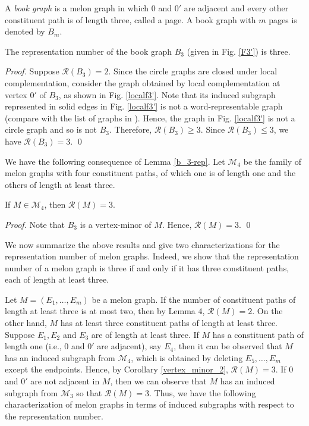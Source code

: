 \documentclass{llncs}
\begin{document}
A \textit{book graph} is a melon graph in which $0$ and $0'$ are adjacent and every other constituent path is of length three, called a page. A book graph with $m$ pages is denoted by $B_m$. 

\begin{lemma}\label{b_3-rep}
	The representation number of the book graph $B_3$ (given in Fig. \ref{F3'}) is three. 
\end{lemma} 
\begin{proof}
	Suppose $\mathcal{R}(B_3) = 2$. Since the circle graphs are closed under local complementation, consider the graph obtained by local complementation at vertex $0'$ of $B_3$, as shown in Fig. \ref{localf3'}. Note that its induced subgraph represented in solid edges in Fig. \ref{localf3'} is not a word-representable graph (compare with the list of graphs in \cite[Figure 3.9]{kitaev15mono}).  Hence, the graph in Fig. \ref{localf3'} is not a circle graph and so is not $B_3$. Therefore, $\mathcal{R}(B_3) \ge 3$. Since $\mathcal{R}(B_3) \le 3$, we have $\mathcal{R}(B_3) = 3$. \qed
\end{proof}

We have the following consequence of Lemma \ref{b_3-rep}. 
Let $\mathcal{M}_4$ be the family of melon graphs with four constituent paths, of which one is of length one and the others of length at least three. 

\begin{corollary}\label{vertex_minor_2}
	If $M \in \mathcal{M}_4$, then $\mathcal{R}(M) = 3$.
\end{corollary} 
\begin{proof}
	Note that $B_3$ is a vertex-minor of $M$. Hence,  $\mathcal{R}(M) = 3$. \qed	
\end{proof}

We now summarize the above results and give two characterizations for the representation number of melon graphs. Indeed, we show that the representation number of a melon graph is three if and only if it has three constituent paths, each of length at least three. 

Let $M = (E_1, \ldots, E_m)$ be a melon graph. If the number of constituent paths of length at least three is at most two, then by Lemma 4, $\mathcal{R}(M) = 2$. On the other hand, $M$ has at least three constituent paths of length at least three. Suppose $E_1, E_2$ and $E_3$ are of length at least three. If $M$ has a constituent path of length one (i.e., $0$ and $0'$ are adjacent), say $E_4$, then it can be observed that $M$ has an induced subgraph from $\mathcal{M}_4$, which is obtained by deleting $E_5, \ldots, E_m$ except the endpoints. Hence, by Corollary \ref{vertex_minor_2}, $\mathcal{R}(M) = 3$. If $0$ and $0'$ are not adjacent in $M$, then we can observe that $M$ has an induced subgraph from $\mathcal{M}_3$ so that $\mathcal{R}(M) = 3$. Thus, we have the following characterization of melon graphs in terms of induced subgraphs with respect to the representation number. 
\end{document}
